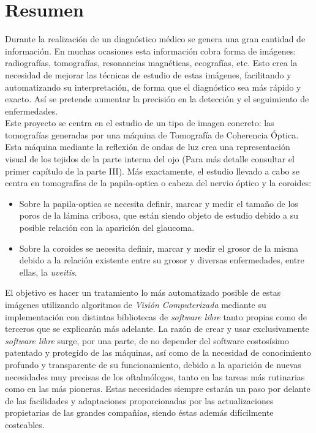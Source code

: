 \section*{Resumen}
Durante la realización de un diagnóstico médico se genera una gran
cantidad de información. En muchas ocasiones esta información cobra
forma de imágenes: radiografías, tomografías, resonancias magnéticas,
ecografías, etc. Esto crea la necesidad de mejorar las técnicas de
estudio de estas imágenes, facilitando y automatizando su
interpretación, de forma que el diagnóstico sea más rápido y
exacto. Así se pretende aumentar la precisión en la detección y el
seguimiento de enfermedades.\\
Este proyecto se centra en el estudio de un tipo de imagen concreto: las tomografías
generadas por una máquina de Tomografía de Coherencia Óptica. Esta
máquina mediante la reflexión de ondas de luz crea una representación
visual de los tejidos de la parte interna del ojo (Para más detalle
consultar el primer capítulo de la parte III). Más exactamente, el
estudio llevado a cabo se centra en tomografías de la
\gls{papila-optica} o cabeza del nervio óptico y la \gls{coroides}:
\begin{itemize}
\item Sobre la \gls{papila-optica} se necesita definir, marcar y medir
  el tamaño de los poros de la lámina cribosa, que están siendo objeto
  de estudio debido a su posible relación con la aparición del
  \gls{glaucoma}.
\item Sobre la \gls{coroides} se necesita definir, marcar y medir el
  grosor de la misma debido a la relación existente entre su grosor y
  diversas enfermedades, entre ellas, la \emph{\gls{uveitis}}.
\end{itemize}
El objetivo es hacer un tratamiento lo más automatizado posible de estas imágenes utilizando algoritmos de \emph{Visión Computerizada}
mediante su implementación con distintas bibliotecas de \emph{software
  libre} tanto propias como de terceros que se explicarán más
adelante. La razón de crear y usar exclusivamente \emph{software
  libre} surge, por una parte, de no depender del software costosísimo
patentado y protegido de las máquinas, así como de la necesidad de
conocimiento profundo y transparente de su funcionamiento, debido a la
aparición de nuevas necesidades muy precisas de los oftalmólogos,
tanto en las tareas más rutinarias como en las más pioneras. Estas
necesidades siempre estarán un paso por delante de las facilidades y
adaptaciones proporcionadas por las actualizaciones propietarias de
las grandes compañías, siendo éstas además difícilmente costeables.
\newpage


